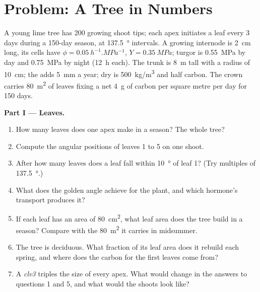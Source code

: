 \section{Problem: A Tree in Numbers}

\begin{problem}
\label{pb:b2:plant-meristems:1}
A young lime tree has \num{200} growing shoot tips; each apex
initiates a leaf every \num{3} days during a \num{150}-day season, at
\qty{137.5}{\degree} intervals. A growing internode is \qty{2}{cm}
long, its cells have $\phi = \qty{0.05}{h^{-1}.MPa^{-1}}$, $Y =
\qty{0.35}{MPa}$; turgor is \qty{0.55}{MPa} by day and
\qty{0.75}{MPa} by night (\qty{12}{h} each). The trunk is
\qty{8}{m} tall with a radius of \qty{10}{cm}; the  adds
\qty{5}{mm} a year; dry  is \qty{500}{kg/m^3} and half carbon.
The crown carries \qty{80}{m^2} of leaves fixing a net \qty{4}{g} of
carbon per square metre per day for \num{150} days.

\medskip
\noindent\textbf{Part I --- Leaves.}
\begin{enumerate}
  \item How many leaves does one apex make in a season? The whole
        tree?
  \item Compute the angular positions of leaves 1 to 5 on one shoot.
  \item After how many leaves does a leaf fall within
        \qty{10}{\degree} of leaf 1? (Try multiples of
        \qty{137.5}{\degree}.)
  \item What does the golden angle achieve for the plant, and which
        hormone's transport produces it?
  \item If each leaf has an area of \qty{80}{cm^2}, what leaf area
        does the tree build in a season? Compare with the
        \qty{80}{m^2} it carries in midsummer.
  \item The tree is deciduous. What fraction of its leaf area does it
        rebuild each spring, and where does the carbon for the first
        leaves come from?
  \item A \emph{clv3}  triples the size of every apex. What
        would change in the answers to questions 1 and 5, and what
        would the shoots look like?
\end{enumerate}


\end{problem}
